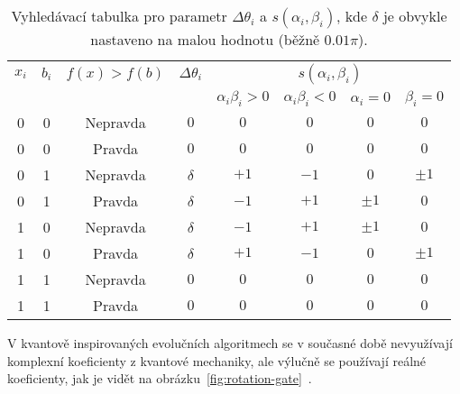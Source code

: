 \begin{enumerate}
        \begin{table}[ht!]
            \centering
            \begin{tabular}{|c|c|c|c|c|c|c|c|}
                \hline
                $x_i$ & $b_i$ & $f(x) > f(b)$ & $\Delta \theta_i$ & \multicolumn{4}{c|}{$s(\alpha_i, \beta_i)$} \\
                \cline{5-8}
                & & & & $\alpha_i \beta_i > 0$& $\alpha_i \beta_i < 0$ & $ \alpha_i = 0$ & $\beta_i = 0$ \\
                \hline
                0 & 0 & Nepravda & $0$      & $0$  & $0$  & $0$     & $0$ \\
                0 & 0 & Pravda   & $0$      & $0$  & $0$  & $0$     & $0$ \\
                0 & 1 & Nepravda & $\delta$ & $+1$ & $-1$ & $0$     & $\pm 1$ \\
                0 & 1 & Pravda   & $\delta$ & $-1$ & $+1$ & $\pm 1$ & $0$ \\
                1 & 0 & Nepravda & $\delta$ & $-1$ & $+1$ & $\pm 1$ & $0$ \\
                1 & 0 & Pravda   & $\delta$ & $+1$ & $-1$ & $0$     & $\pm 1$ \\
                1 & 1 & Nepravda & $0$      & $0$  & $0$  & $0$     & $0$ \\
                1 & 1 & Pravda   & $0$      & $0$  & $0$  & $0$     & $0$ \\
                \hline
            \end{tabular}
            \caption{Vyhledávací tabulka pro parametr $\Delta\theta_i$ a $s(\alpha_i, \beta_i)$, kde $\delta$ je obvykle nastaveno na malou hodnotu (běžně $0.01 \pi$).}
            \label{tab:look-up-table-angle-update}
        \end{table}
\end{enumerate}

V kvantově inspirovaných evolučních algoritmech se v současné době nevyužívají komplexní koeficienty z kvantové mechaniky, ale výlučně se používají reálné koeficienty, jak je vidět na obrázku~\ref{fig:rotation-gate}~\cite{NaturalComputing}.

